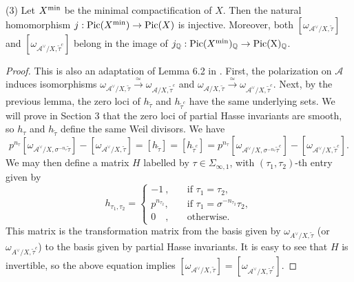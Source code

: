 \documentclass{article}
\begin{document}
	(3) Let $X^{\textnormal{min}}$ be the minimal compactification of $X$. Then the natural homomorphism $j:\textnormal{Pic}(X^{\textnormal{min}})\to\textnormal{Pic}(X)$ is injective. Moreover, both $[\omega_{\mathcal{A}^\vee/X,\tilde\tau}]$ and $[\omega_{\mathcal{A}^\vee/X,\tilde\tau^c}]$ belong in the image of $j_{\mathbb{Q}}:\textnormal{Pic}(X^{\textnormal{min}})_{\mathbb{Q}}\to \textnormal{Pic}(\textnormal{X})_{\mathbb{Q}}$.

\begin{proof} This is also an adaptation of Lemma 6.2 in \citep{Tian-Xiao}. First, the polarization on $\mathcal{A}$ induces isomorphisms $\omega_{\mathcal{A}^\vee/X,\tilde\tau}\stackrel{\simeq}{\longrightarrow}\omega_{\mathcal{A}/X,\tilde\tau^c}$ and $\omega_{\mathcal{A}/X,\tilde\tau}\stackrel{\simeq}{\longrightarrow}\omega_{\mathcal{A}^\vee/X,\tilde\tau^c}$. Next, by the previous lemma, the zero loci of $h_{\tilde\tau}$ and $h_{\tilde\tau^c}$ have the same underlying sets. We will prove in Section 3 that the zero loci of partial Hasse invariants are smooth, so $h_{\tau}$ and $h_{\tilde\tau}$ define the same Weil divisors. We have 
	\begin{equation}
		p^{n_\tau}[\omega_{\mathcal{A}^\vee/X,\sigma^{-n_\tau}\tilde\tau}]-[\omega_{\mathcal{A}^\vee/X,\tilde\tau}]=[h_{\tilde\tau}]=[h_{\tilde\tau^c}]=p^{n_\tau}[\omega_{\mathcal{A}^\vee/X,\sigma^{-n_\tau}\tilde\tau^c}]-[\omega_{\mathcal{A}^\vee/X,\tilde\tau^c}].
	\end{equation}
We may then define a matrix $H$ labelled by $\tau\in\Sigma_{\infty,1}$, with $(\tau_1,\tau_2)$-th entry given by
	\begin{equation}
		h_{\tau_1,\tau_2}=\left\{
\begin{aligned}
-1\ ,\quad &\text{if }\tau_1=\tau_2, \\
p^{n_{\tau_2}},\quad &\text{if }\tau_1=\sigma^{-n_{\tau_2}}\tau_2,\\
0\quad,\quad &\text{otherwise}.
\end{aligned}\right.
	\end{equation}
This matrix is the transformation matrix from the basis given by $\omega_{A^\vee/X,\tilde\tau}$ (or $\omega_{A^\vee/X,\tilde\tau^c}$) to the basis given by partial Hasse invariants. It is easy to see that $H$ is invertible, so the above equation implies $[\omega_{\mathcal{A}^\vee/X,\tilde\tau}]=[\omega_{\mathcal{A}^\vee/X,\tilde\tau^c}]$.


\end{proof}
\end{document}
